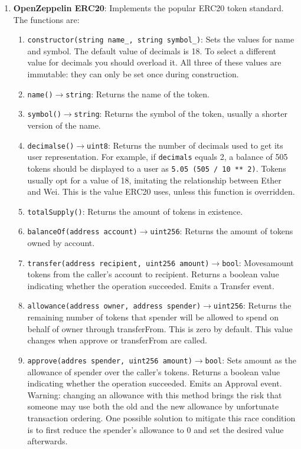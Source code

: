 \begin{enumerate}
\item\textbf{OpenZeppelin ERC20}: Implements the popular ERC20 token standard. The functions are:
    \begin{enumerate}
	\item\verb|constructor(string name_, string symbol_)|: Sets the values for name and symbol. The default value of decimals is 18. To select a different value for decimals you should overload it. All three of these values are immutable: they can only be set once during construction.
	\item\verb|name()|$\rightarrow$\verb|string|: Returns the name of the token.
	\item\verb|symbol()|$\rightarrow$\verb|string|: Returns the symbol of the token, usually a shorter version of the name.
	\item\verb|decimalse()|$\rightarrow$\verb|uint8|: Returns the number of decimals used to get its user representation. For example, if \verb|decimals| equals 2, a balance of 505 tokens should be displayed to a user as \verb|5.05 (505 / 10 ** 2)|. Tokens usually opt for a value of 18, imitating the relationship between Ether and Wei. This is the value ERC20 uses, unless this function is overridden.
	\item\verb|totalSupply()|: Returns the amount of tokens in existence.
	\item\verb|balanceOf(address account)|$\rightarrow$\verb|uint256|: Returns the amount of tokens owned by account.
	\item\verb|transfer(address recipient, uint256 amount)|$\rightarrow$\verb|bool|: Moves\linebreak amount tokens from the caller’s account to recipient. Returns a boolean value indicating whether the operation succeeded. Emits a Transfer event.
	\item\verb|allowance(address owner, address spender)|$\rightarrow$\verb|uint256|: Returns the remaining number of tokens that spender will be allowed to spend on behalf of owner through transferFrom. This is zero by default. This value changes when approve or transferFrom are called.
	\item\verb|approve(addres spender, uint256 amount)|$\rightarrow$\verb|bool|: Sets amount as the allowance of spender over the caller’s tokens. Returns a boolean value indicating whether the operation succeeded. Emits an Approval event. Warning: changing an allowance with this method brings the risk that someone may use both the old and the new allowance by unfortunate transaction ordering. One possible solution to mitigate this race condition is to first reduce the spender’s allowance to 0 and set the desired value afterwards.

\end{enumerate}
\end{enumerate}
